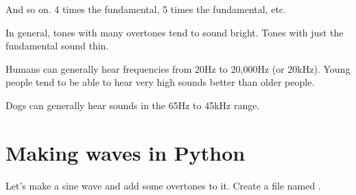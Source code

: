 \begin{center}
    
\end{center}
And so on. 4 times the fundamental, 5 times the fundamental, etc.

In general, tones with many overtones tend to sound bright. Tones
with just the fundamental sound thin.

Humans can generally hear frequencies from 20Hz to 20,000Hz (or
20kHz).  Young people tend to be able to hear very high sounds better
than older people.

Dogs can generally hear sounds in the 65Hz to 45kHz range.

\section{Making waves in Python}

Let's make a sine wave and add some overtones to it.  Create a file named .

